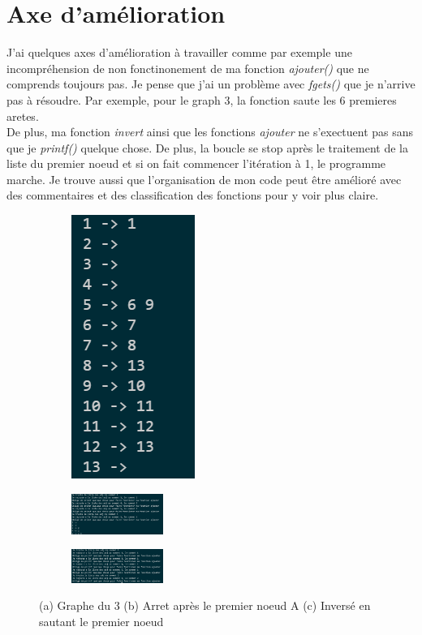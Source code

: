 \documentclass[a4paper]{article}
\begin{document}
\section{Axe d'amélioration}
J'ai quelques axes d'amélioration à travailler comme par exemple une incompréhension de non fonctinonement de ma fonction \emph{ajouter()} que 
ne comprends toujours pas. Je pense que j'ai un problème avec \emph{fgets()} que je n'arrive pas à résoudre. Par exemple, pour le graph 3, la fonction
saute les 6 premieres aretes.\\
De plus, ma fonction \emph{invert} ainsi que les fonctions \emph{ajouter} ne s'exectuent pas sans que je \emph{printf()} quelque chose. De plus, la boucle 
se stop après le traitement de la liste du premier noeud et si on fait commencer l'itération à 1, le programme marche.
Je trouve aussi que l'organisation de mon code peut être amélioré avec des commentaires et des classification des fonctions pour y voir plus claire.\\
\hfill
\begin{figure}[htp]
  \centering
  \begin{subfigure}{0.30\textwidth}
    \centering
    \includegraphics[scale=0.5]{./Photos/Bug_saut.png}
    \caption{}
  \end{subfigure}%
  \hfill
  \begin{subfigure}{0.30\textwidth}
    \centering
    \includegraphics[width=3cm]{./Photos/Invert_bug1.png}
    \caption{}
  \end{subfigure}%
  \hfill
  \begin{subfigure}{0.30\textwidth}
      \centering
      \includegraphics[width=3cm]{./Photos/Invert_bug2.png}
      \caption{}
  \end{subfigure}%
  \hfill
\caption { (a) Graphe du 3 (b) Arret après le premier noeud A (c) Inversé en sautant le premier noeud}
\end{figure}
\end{document}
